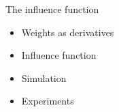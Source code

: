 


\begin{frame}{The influence function}

\begin{itemize}
    \item Weights as derivatives
    \item Influence function
    \item Simulation
    \item Experiments
\end{itemize}

\end{frame}
